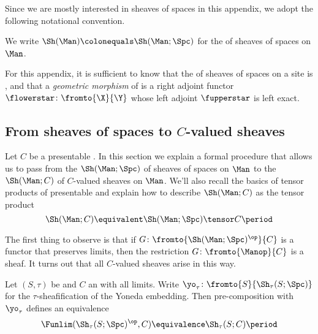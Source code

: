 Since we are mostly interested in sheaves of spaces in this appendix, we adopt the following notational convention.

\begin{notation}
	We write $ \Sh(\Man) \colonequals \Sh(\Man;\Spc) $ for the \topos of sheaves of spaces on $ \Man $.
\end{notation}

\begin{remark}
	For this appendix, it is sufficient to know that the \category of sheaves of spaces on a site is \atopos, and that a \textit{geometric morphism} of \topoi is a right adjoint functor $ \flowerstar \colon \fromto{\X}{\Y} $ whose left adjoint $ \fupperstar $ is left exact.
\end{remark}


\subsection{From sheaves of spaces to \texorpdfstring{$ C $}{C}-valued sheaves}\label{sec:Cvaluedsheaves}

Let $ C $ be a presentable \category.
In this section we explain a formal procedure that allows us to pass from the \category $ \Sh(\Man;\Spc) $ of sheaves of spaces on $ \Man $ to the \category $ \Sh(\Man;C) $ of $ C $-valued sheaves on $ \Man $.
We'll also recall the basics of tensor products of presentable \categories and explain how to describe $ \Sh(\Man;C) $ as the tensor product
\begin{equation*}
	\Sh(\Man;C) \equivalent \Sh(\Man;\Spc) \tensor C \period
\end{equation*} 

The first thing to observe is that if $ G \colon \fromto{\Sh(\Man;\Spc)^{\op}}{C} $ is a functor that preserves limits, then the restriction $ G \colon \fromto{\Manop}{C} $ is a sheaf. 
It turns out that all $ C $-valued sheaves arise in this way.

\begin{proposition}
	Let $ (S,\tau) $ be \asite and $ C $ an \category with all limits.
	Write $ \yo_{\tau} \colon \fromto{S}{\Sh_{\tau}(S;\Spc)} $ for the $ \tau $-sheafification of the Yoneda embedding.
	Then pre-composition with $ \yo_{\tau} $ defines an equivalence
	\begin{equation*}
		\Funlim(\Sh_{\tau}(S;\Spc)^{\op},C) \equivalence \Sh_{\tau}(S;C) \period
	\end{equation*} 
\end{proposition}

